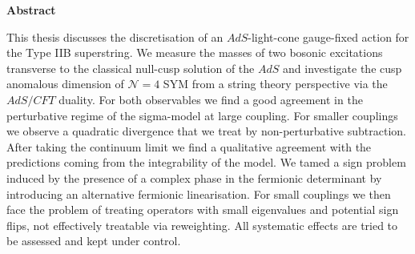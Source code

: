 %
%
\begin{center}
{\sffamily \bfseries\Large Abstract}\\
\end{center}%
\vspace{1cm}
%
This thesis discusses the discretisation of an $AdS$-light-cone gauge-fixed action for the Type IIB  superstring. We measure the masses of two bosonic excitations transverse to the classical null-cusp solution of the $AdS$  and investigate the cusp anomalous dimension of $\mathcal{N}=4$	SYM from a string theory perspective via the $AdS/CFT$ duality. For both observables we find a good agreement in the perturbative regime of the sigma-model at large  coupling. For smaller couplings we observe a quadratic divergence that we treat by non-perturbative subtraction. After taking the continuum limit we find a qualitative agreement with the predictions coming from the integrability of the model. We tamed a sign problem induced by the presence of a complex phase in the fermionic determinant by introducing an alternative fermionic linearisation. For small couplings we then face the problem of treating operators with small eigenvalues and potential sign flips, not effectively treatable via reweighting. All systematic effects are tried to be assessed and kept under control.\\
\vspace{1.5cm}

